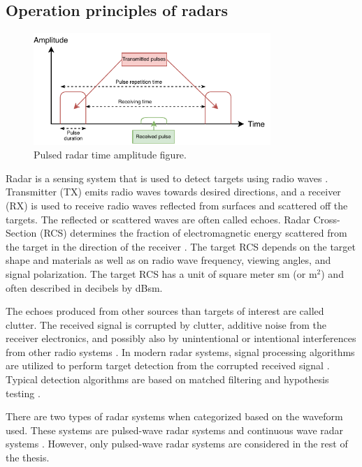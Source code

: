 \documentclass[english, 12pt, a4paper, elec, utf8, a-1b, online]{aaltothesis}
\numberwithin{equation}{section}
\begin{document}
\subsection{Operation principles of radars} \label{sec:radar_opertaion_principle}

\begin{figure}[htb]
    \centering
    \includegraphics[width=0.8\textwidth]{figures/background/pulsed_radar.pdf}
    \caption{Pulsed radar time amplitude figure.}
    \label{fig:pulsed_radar}
\end{figure}

Radar is a sensing system that is used to detect targets using radio waves \cite{Curry2011}.
Transmitter (TX) emits radio waves towards desired directions, and a receiver (RX) is used to receive radio waves reflected from surfaces and scattered off the targets. 
The reflected or scattered waves are often called echoes.
Radar Cross-Section (RCS) determines the fraction of electromagnetic energy scattered from the target in the direction of the receiver \cite{Curry2011}.
The target RCS depends on the target shape and materials as well as on radio wave frequency, viewing angles, and signal polarization.
The target RCS has a unit of square meter sm (or m$^2$) and often described in decibels by dBsm.

The echoes produced from other sources than targets of interest are called clutter.
The received signal is corrupted by clutter, additive noise from the receiver electronics, and possibly also by unintentional or intentional interferences from other radio systems \cite{Curry2011}.
In modern radar systems, signal processing algorithms are utilized to perform target detection from the corrupted received signal \cite{Mahafza2015}.
Typical detection algorithms are based on matched filtering and hypothesis testing \cite{Mahafza2015}.

There are two types of radar systems when categorized based on the waveform used.
These systems are pulsed-wave radar systems and continuous wave radar systems \cite{Mahafza2015}.
However, only pulsed-wave radar systems are considered in the rest of the thesis.
\end{document}
